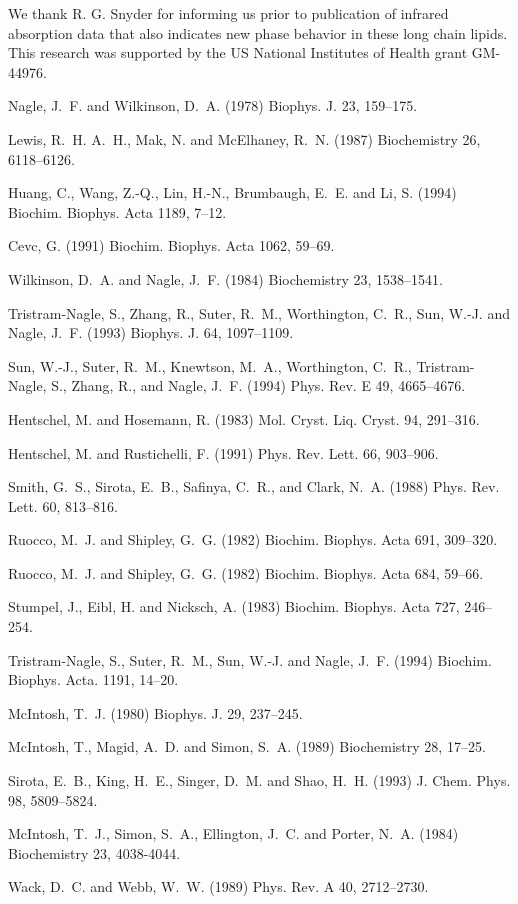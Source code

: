 We thank R. G. Snyder for informing us prior to publication
of infrared absorption data that also indicates new phase
behavior in these long chain lipids.  This research was supported by
the US National Institutes of Health grant GM-44976.

\begin{thebibliography}{10}

Nagle, J.~F. and Wilkinson, D.~A. (1978) Biophys. J. 23,  159--175.

Lewis, R.~H. A.~H.,  Mak, N.  and McElhaney, R.~N. (1987) Biochemistry 26,  
6118--6126.

Huang, C., Wang, Z.-Q., Lin, H.-N., Brumbaugh, E.~E. and Li, S. (1994) 
Biochim. Biophys. Acta 1189, 7--12.

Cevc, G. (1991) Biochim. Biophys. Acta 1062, 59--69.

Wilkinson, D.~A. and Nagle, J.~F. (1984) Biochemistry 23, 1538--1541.

Tristram-Nagle, S., Zhang, R., Suter, R.~M., Worthington, C.~R., Sun, W.-J. and
  Nagle, J.~F. (1993) Biophys. J. 64, 1097--1109.

Sun, W.-J., Suter, R.~M., Knewtson, M.~A., Worthington, C.~R., 
Tristram-Nagle, S., Zhang, R., and Nagle, J.~F. (1994) Phys. Rev. E 49, 
4665--4676.

Hentschel, M. and Hosemann, R. (1983) Mol. Cryst. Liq. Cryst. 94, 291--316.

Hentschel, M. and Rustichelli, F. (1991) Phys. Rev. Lett. 66, 903--906.

Smith, G.~S., Sirota, E.~B., Safinya, C.~R., and Clark, N.~A. (1988) 
Phys. Rev. Lett. 60,  813--816.

Ruocco, M.~J. and Shipley, G.~G. (1982) Biochim. Biophys. Acta 691, 309--320.

Ruocco, M.~J. and Shipley, G.~G. (1982) Biochim. Biophys. Acta 684,  59--66.

Stumpel, J., Eibl, H. and Nicksch, A. (1983) Biochim. Biophys. Acta 727, 
246--254.

Tristram-Nagle, S., Suter, R.~M., Sun, W.-J. and Nagle, J.~F. (1994) Biochim. 
Biophys. Acta. 1191, 14--20.

McIntosh, T.~J. (1980) Biophys. J. 29, 237--245. 

McIntosh, T., Magid, A.~D. and Simon, S.~A. (1989) Biochemistry 28, 17--25.

Sirota, E.~B., King, H.~E., Singer, D.~M. and Shao, H.~H. (1993) J. Chem. 
Phys. 98, 5809--5824.

McIntosh, T.~J., Simon, S.~A., Ellington, J.~C. and Porter, N.~A. (1984)
Biochemistry 23, 4038-4044.

Wack, D.~C. and Webb, W.~W. (1989) Phys. Rev. A 40, 2712--2730.

\end{thebibliography}

